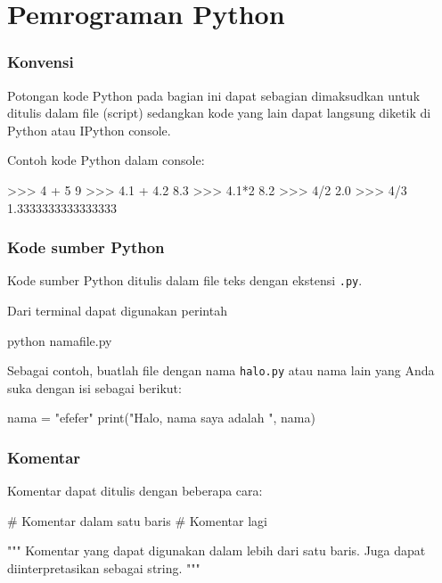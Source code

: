 \section{Pemrograman Python}

\begin{frame}[fragile]
\frametitle{Konvensi}

Potongan kode Python pada bagian ini dapat sebagian dimaksudkan untuk
ditulis dalam file (script) sedangkan kode yang lain dapat langsung
diketik di Python atau IPython console.

Contoh kode Python dalam console:
\begin{pyconcode}
>>> 4 + 5
9
>>> 4.1 + 4.2
8.3
>>> 4.1*2
8.2
>>> 4/2
2.0
>>> 4/3
1.3333333333333333
\end{pyconcode}

\end{frame}


\begin{frame}[fragile]
\frametitle{Kode sumber Python}

Kode sumber Python ditulis dalam file teks dengan ekstensi \texttt{.py}.

Dari terminal dapat digunakan perintah
\begin{bashcode}
python namafile.py
\end{bashcode}

Sebagai contoh, buatlah file dengan nama \texttt{halo.py} atau nama lain
yang Anda suka dengan isi sebagai berikut:
\begin{pythoncode}
nama = "efefer"
print("Halo, nama saya adalah ", nama)
\end{pythoncode}

\end{frame}


\begin{frame}[fragile]
\frametitle{Komentar}

Komentar dapat ditulis dengan beberapa cara:
\begin{pythoncode}
# Komentar dalam satu baris
# Komentar lagi

"""
Komentar yang dapat digunakan dalam lebih dari satu baris.
Juga dapat diinterpretasikan sebagai string.
"""
\end{pythoncode}

\end{frame}



